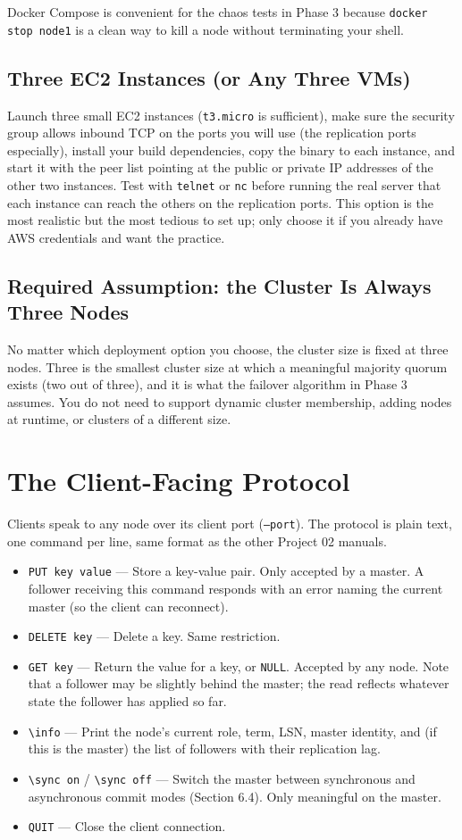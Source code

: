 \documentclass[11pt,a4paper]{article}
\begin{document}
Docker Compose is convenient for the chaos tests in Phase 3 because \texttt{docker stop node1} is a clean way to kill a node without terminating your shell.

\subsection{Three EC2 Instances (or Any Three VMs)}
Launch three small EC2 instances (\texttt{t3.micro} is sufficient), make sure the security group allows inbound TCP on the ports you will use (the replication ports especially), install your build dependencies, copy the binary to each instance, and start it with the peer list pointing at the public or private IP addresses of the other two instances. Test with \texttt{telnet} or \texttt{nc} before running the real server that each instance can reach the others on the replication ports. This option is the most realistic but the most tedious to set up; only choose it if you already have AWS credentials and want the practice.

\subsection{Required Assumption: the Cluster Is Always Three Nodes}
No matter which deployment option you choose, the cluster size is fixed at three nodes. Three is the smallest cluster size at which a meaningful majority quorum exists (two out of three), and it is what the failover algorithm in Phase 3 assumes. You do not need to support dynamic cluster membership, adding nodes at runtime, or clusters of a different size.

\section{The Client-Facing Protocol}

Clients speak to any node over its client port (\texttt{--port}). The protocol is plain text, one command per line, same format as the other Project 02 manuals.

\begin{itemize}
\item \texttt{PUT key value} --- Store a key-value pair. Only accepted by a master. A follower receiving this command responds with an error naming the current master (so the client can reconnect).
\item \texttt{DELETE key} --- Delete a key. Same restriction.
\item \texttt{GET key} --- Return the value for a key, or \texttt{NULL}. Accepted by any node. Note that a follower may be slightly behind the master; the read reflects whatever state the follower has applied so far.
\item \verb|\info| --- Print the node's current role, term, LSN, master identity, and (if this is the master) the list of followers with their replication lag.
\item \verb|\sync on| / \verb|\sync off| --- Switch the master between synchronous and asynchronous commit modes (Section 6.4). Only meaningful on the master.
\item \texttt{QUIT} --- Close the client connection.
\end{itemize}
\end{document}
